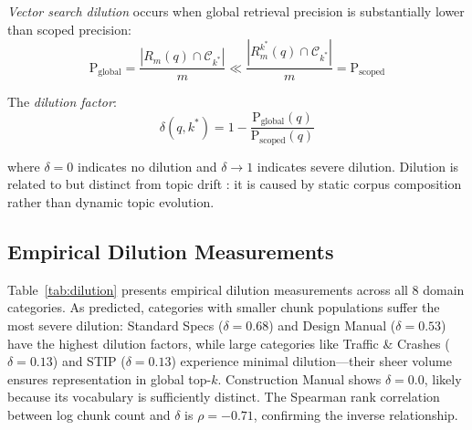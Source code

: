 \documentclass[11pt,a4paper]{article}
\begin{document}
\textit{Vector search dilution} occurs when global retrieval precision is substantially lower than scoped precision:
\begin{equation}
\text{P}_{\text{global}} = \frac{|R_m(q) \cap \mathcal{C}_{k^*}|}{m} \ll \frac{|R_m^{k^*}(q) \cap \mathcal{C}_{k^*}|}{m} = \text{P}_{\text{scoped}}
\end{equation}

The \textit{dilution factor}:
\begin{equation}
\delta(q, k^*) = 1 - \frac{\text{P}_{\text{global}}(q)}{\text{P}_{\text{scoped}}(q)}
\label{eq:dilution}
\end{equation}

where $\delta = 0$ indicates no dilution and $\delta \rightarrow 1$ indicates severe dilution. Dilution is related to but distinct from topic drift \cite{allan1998topicdetection}: it is caused by static corpus composition rather than dynamic topic evolution.

\subsection{Empirical Dilution Measurements}

Table~\ref{tab:dilution} presents empirical dilution measurements across all 8 domain categories. As predicted, categories with smaller chunk populations suffer the most severe dilution: Standard Specs ($\delta = 0.68$) and Design Manual ($\delta = 0.53$) have the highest dilution factors, while large categories like Traffic \& Crashes ($\delta = 0.13$) and STIP ($\delta = 0.13$) experience minimal dilution---their sheer volume ensures representation in global top-$k$. Construction Manual shows $\delta = 0.0$, likely because its vocabulary is sufficiently distinct. The Spearman rank correlation between log chunk count and $\delta$ is $\rho = -0.71$, confirming the inverse relationship.

\begin{table}[H]
\centering
{}
\caption{Dilution factor $\delta$ by category. Categories with fewer chunks suffer highest dilution (Spearman $\rho = -0.71$).}
\label{tab:dilution}
\end{table}
\end{document}
